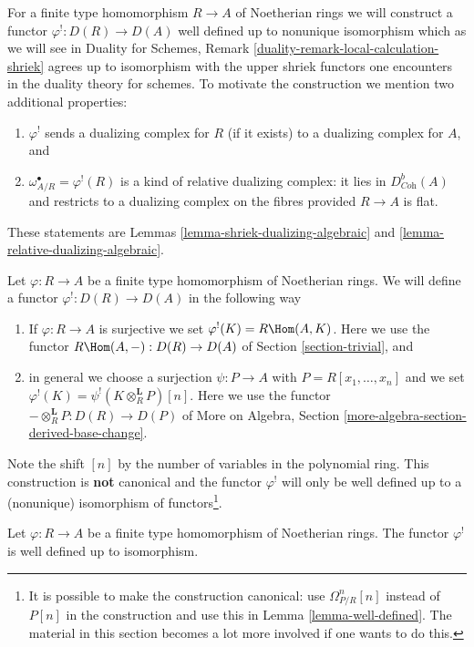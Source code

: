 \noindent
For a finite type homomorphism $R \to A$ of Noetherian rings
we will construct a functor $\varphi^! : D(R) \to D(A)$
well defined up to nonunique isomorphism which
as we will see in Duality for Schemes, Remark
\ref{duality-remark-local-calculation-shriek}
agrees up to isomorphism with the upper shriek functors
one encounters in the duality theory for schemes.
To motivate the construction we mention two additional properties:
\begin{enumerate}
\item $\varphi^!$ sends a dualizing complex for $R$ (if it exists)
to a dualizing complex for $A$, and
\item $\omega_{A/R}^\bullet = \varphi^!(R)$ is a kind of
relative dualizing complex: it lies in $D^b_{\textit{Coh}}(A)$ and restricts
to a dualizing complex on the fibres provided $R \to A$ is flat.
\end{enumerate}
These statements are Lemmas \ref{lemma-shriek-dualizing-algebraic} and
\ref{lemma-relative-dualizing-algebraic}.

\medskip\noindent
Let $\varphi : R \to A$ be a finite type homomorphism of Noetherian rings.
We will define a functor $\varphi^! : D(R) \to D(A)$ in the following way
\begin{enumerate}
\item If $\varphi : R \to A$ is surjective we set
$\varphi^!(K) = R\Hom(A, K)$. Here we use the functor
$R\Hom(A, -) : D(R) \to D(A)$ of
Section \ref{section-trivial}, and
\item in general we choose a surjection $\psi : P \to A$ with
$P = R[x_1, \ldots, x_n]$ and we set
$\varphi^!(K) = \psi^!(K \otimes_R^\mathbf{L} P)[n]$.
Here we use the functor
$- \otimes_R^\mathbf{L} P : D(R) \to D(P)$
of More on Algebra, Section \ref{more-algebra-section-derived-base-change}.
\end{enumerate}
Note the shift $[n]$ by the number of variables in the polynomial
ring. This construction is {\bf not} canonical and the functor
$\varphi^!$ will only be well defined up to a (nonunique) isomorphism of
functors\footnote{It is possible to make the construction canonical:
use $\Omega^n_{P/R}[n]$ instead of $P[n]$ in the
construction and use this in Lemma \ref{lemma-well-defined}.
The material in this section becomes a lot more involved
if one wants to do this.}.

\begin{lemma}
\label{lemma-well-defined}
Let $\varphi : R \to A$ be a finite type homomorphism of
Noetherian rings. The functor $\varphi^!$ is well defined
up to isomorphism.
\end{lemma}

